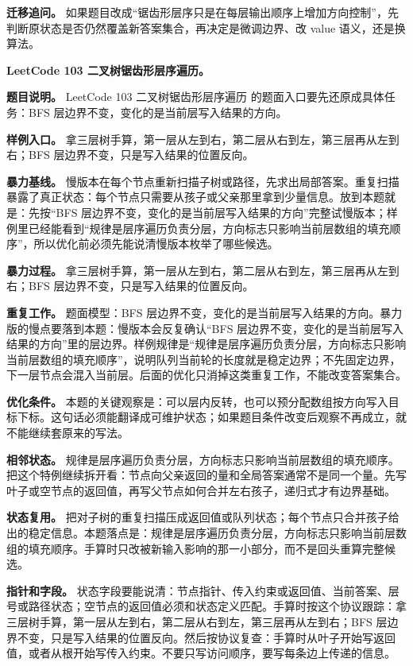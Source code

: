 \textbf{迁移追问。} 如果题目改成“锯齿形层序只是在每层输出顺序上增加方向控制”，先判断原状态是否仍然覆盖新答案集合，再决定是微调边界、改 value 语义，还是换算法。

\noindent\textbf{LeetCode 103 二叉树锯齿形层序遍历。}

\textbf{题目说明。} LeetCode 103 二叉树锯齿形层序遍历 的题面入口要先还原成具体任务：BFS 层边界不变，变化的是当前层写入结果的方向。

\textbf{样例入口。} 拿三层树手算，第一层从左到右，第二层从右到左，第三层再从左到右；BFS 层边界不变，只是写入结果的位置反向。

\textbf{暴力基线。} 慢版本在每个节点重新扫描子树或路径，先求出局部答案。重复扫描暴露了真正状态：每个节点只需要从孩子或父亲那里拿到少量信息。放到本题就是：先按“BFS 层边界不变，变化的是当前层写入结果的方向”完整试慢版本；样例里已经能看到“规律是层序遍历负责分层，方向标志只影响当前层数组的填充顺序”，所以优化前必须先能说清慢版本枚举了哪些候选。

\textbf{暴力过程。} 拿三层树手算，第一层从左到右，第二层从右到左，第三层再从左到右；BFS 层边界不变，只是写入结果的位置反向。

\textbf{重复工作。} 题面模型：BFS 层边界不变，变化的是当前层写入结果的方向。暴力版的慢点要落到本题：慢版本会反复确认“BFS 层边界不变，变化的是当前层写入结果的方向”里的层边界。样例规律是“规律是层序遍历负责分层，方向标志只影响当前层数组的填充顺序”，说明队列当前轮的长度就是稳定边界；不先固定边界，下一层节点会混入当前层。后面的优化只消掉这类重复工作，不能改变答案集合。

\textbf{优化条件。} 本题的关键观察是：可以层内反转，也可以预分配数组按方向写入目标下标。这句话必须能翻译成可维护状态；如果题目条件改变后观察不再成立，就不能继续套原来的写法。

\textbf{相邻状态。} 规律是层序遍历负责分层，方向标志只影响当前层数组的填充顺序。把这个特例继续拆开看：节点向父亲返回的量和全局答案通常不是同一个量。先写叶子或空节点的返回值，再写父节点如何合并左右孩子，递归式才有边界基础。

\textbf{状态复用。} 把对子树的重复扫描压成返回值或队列状态；每个节点只合并孩子给出的稳定信息。本题落点是：规律是层序遍历负责分层，方向标志只影响当前层数组的填充顺序。手算时只改被新输入影响的那一小部分，而不是回头重算完整候选。

\textbf{指针和字段。} 状态字段要能说清：节点指针、传入约束或返回值、当前答案、层号或路径状态；空节点的返回值必须和状态定义匹配。手算时按这个协议跟踪：拿三层树手算，第一层从左到右，第二层从右到左，第三层再从左到右；BFS 层边界不变，只是写入结果的位置反向。然后按协议复查：手算时从叶子开始写返回值，或者从根开始写传入约束。不要只写访问顺序，要写每条边上传递的信息。

